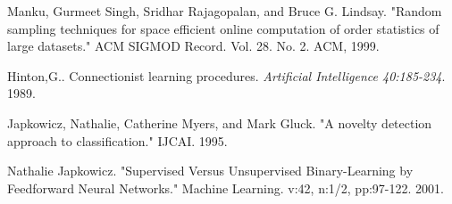 \documentclass[conference]{IEEEtran}
\begin{document}
\begin{thebibliography}{9}
	Manku, Gurmeet Singh, Sridhar Rajagopalan, and Bruce G. Lindsay. "Random sampling techniques for space efficient online computation of order statistics of large datasets." ACM SIGMOD Record. Vol. 28. No. 2. ACM, 1999.
	
	
	Hinton,G.. Connectionist learning procedures. \textit{Artificial Intelligence  40:185-234}. 1989. 
	
	Japkowicz, Nathalie, Catherine Myers, and Mark Gluck. "A novelty detection approach to classification." IJCAI. 1995.
	
	Nathalie Japkowicz. "Supervised Versus Unsupervised Binary-Learning by Feedforward Neural Networks." Machine Learning. v:42, n:1/2, pp:97-122. 2001.
	
	
	
	
	
	
	
	
	
	
	
	
	
\end{thebibliography}





\end{document}
